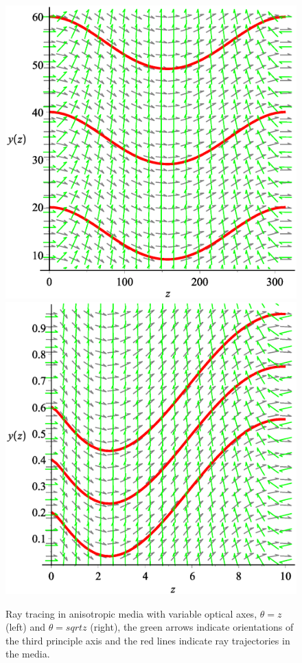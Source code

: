 \documentclass[9pt,twocolumn,twoside]{osajnl}
\begin{document}
\begin{figure}[htbp]
\centering
\includegraphics[scale=0.2]{Visualization4}
\includegraphics[scale=0.2]{Visualization3}
\caption{Ray tracing in anisotropic media with variable optical axes, $\theta=z$ (left) and $\theta=sqrt{z}$ (right),  the  green arrows  indicate orientations of the third principle axis and the red lines  indicate ray trajectories  in the media.}
\label{curvedspace2}
\end{figure}
\end{document}
